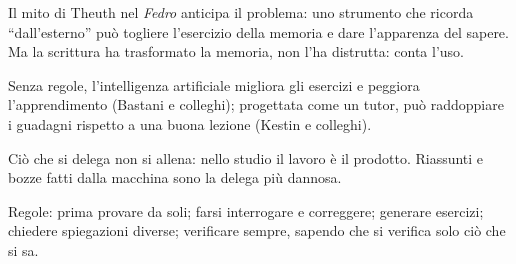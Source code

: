 \begin{sintesi}
  \item Il mito di Theuth nel \emph{Fedro} anticipa il problema: uno
        strumento che ricorda \enquote{dall'esterno} può togliere
        l'esercizio della memoria e dare l'apparenza del sapere. Ma la
        scrittura ha trasformato la memoria, non l'ha distrutta: conta
        l'uso.
  \item Senza regole, l'intelligenza artificiale migliora gli esercizi e
        peggiora l'apprendimento (Bastani e colleghi); progettata come
        un tutor, può raddoppiare i guadagni rispetto a una buona
        lezione (Kestin e colleghi).
  \item Ciò che si delega non si allena: nello studio il lavoro è il
        prodotto. Riassunti e bozze fatti dalla macchina sono la
        delega più dannosa.
  \item Regole: prima provare da soli; farsi interrogare e correggere;
        generare esercizi; chiedere spiegazioni diverse; verificare
        sempre, sapendo che si verifica solo ciò che si sa.
\end{sintesi}

\finecapitolo
